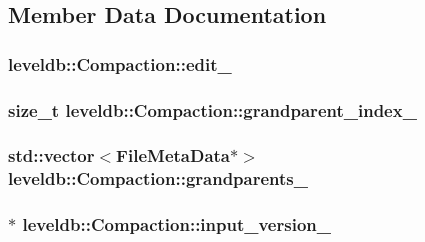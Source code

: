\subsection{Member Data Documentation}
\hypertarget{classleveldb_1_1_compaction_a425d0ea6460c070e11711a8ca06c68fa}{
\subsubsection[{edit\-\_\-}]{ leveldb\-::\-Compaction\-::edit\-\_\-\hspace{0.3cm}{\ttfamily [private]}}}\label{classleveldb_1_1_compaction_a425d0ea6460c070e11711a8ca06c68fa}
\hypertarget{classleveldb_1_1_compaction_a852631569cc903b8b37f524a86a397e1}{
\subsubsection[{grandparent\-\_\-index\-\_\-}]{\setlength{\rightskip}{0pt plus 5cm}size\-\_\-t leveldb\-::\-Compaction\-::grandparent\-\_\-index\-\_\-\hspace{0.3cm}{\ttfamily [private]}}}\label{classleveldb_1_1_compaction_a852631569cc903b8b37f524a86a397e1}
\hypertarget{classleveldb_1_1_compaction_a7b2b689910416375addbeeef11d4b01d}{
\subsubsection[{grandparents\-\_\-}]{\setlength{\rightskip}{0pt plus 5cm}std\-::vector$<${\bf File\-Meta\-Data}$\ast$$>$ leveldb\-::\-Compaction\-::grandparents\-\_\-\hspace{0.3cm}{\ttfamily [private]}}}\label{classleveldb_1_1_compaction_a7b2b689910416375addbeeef11d4b01d}
\hypertarget{classleveldb_1_1_compaction_a8671451e616a9553121d554c096f90ad}{
\subsubsection[{input\-\_\-version\-\_\-}]{$\ast$ leveldb\-::\-Compaction\-::input\-\_\-version\-\_\-\hspace{0.3cm}{\ttfamily [private]}}}\label{classleveldb_1_1_compaction_a8671451e616a9553121d554c096f90ad}
